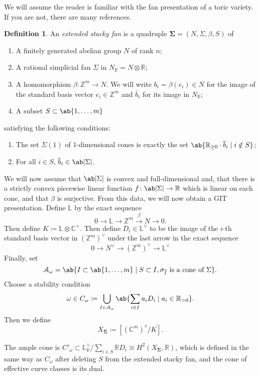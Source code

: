 \documentclass[leqno, openany]{memoir}
\theoremstyle{definition}
\newtheorem{defn}[thm]{Definition}
\theoremstyle{remark}
\theoremstyle{plain}
\theoremstyle{definition}
\theoremstyle{remark}
\newcommand{\R}{\mathbb{R}}
\newcommand{\C}{\mathbb{C}}
\newcommand{\Z}{\mathbb{Z}}
\renewcommand{\L}{\mathbb{L}}
\newcommand{\mc}[1]{\mathcal{#1}}
\newcommand{\ol}[1]{\overline{#1}}
\begin{document}
We will assume the reader is familiar with the fan presentation of a toric variety. If you are not, there are many references.

\begin{defn}
    An \textit{extended stacky fan} is a quadruple $\bm{\Sigma} = (N, \Sigma, \beta, S)$ of
    \begin{enumerate}
        \item A finitely generated abelian group $N$ of rank $n$;
        \item A rational simplicial fan $\Sigma$ in $N_{\R} = N \otimes \R$;
        \item A homomorphism $\beta \colon \Z^m \to N$. We will write $b_i = \beta(e_i) \in N$ for the image of the standard basis vector $e_i \in \Z^m$ and $\ol{b}_i$ for its image in $N_{\R}$;
        \item A subset $S \subset \ab\{1,\ldots,m\}$
    \end{enumerate}
    satisfying the following conditions:
    \begin{enumerate}
        \item The set $\Sigma(1)$ of $1$-dimensional cones is exactly the set $\ab\{\R_{\geq 0} \cdot \ol{b}_i \mid i \notin S \}$;
        \item For all $i \in S$, $\ol{b}_i \in \ab|\Sigma|$.
    \end{enumerate}
\end{defn}

We will now assume that $\ab|\Sigma|$ is convex and full-dimensional and, that there is a strictly convex piecewise linear function $f \colon \ab|\Sigma| \to \R$ which is linear on each cone, and that $\beta$ is surjective. From this data, we will now obtain a GIT presentation. Define $\L$ by the exact sequence
\[ 0 \to \L \xrightarrow{} \Z^m \xrightarrow{\beta} N \to 0. \]
Then define $K \coloneqq \L \otimes \C^{\times}$. Then define $D_i \in \L^{\vee}$ to be the image of the $i$-th standard basis vector in $(\Z^m)^{\vee}$ under the last arrow in the exact sequence
\[ 0 \to N^{\vee} \to (\Z^m)^{\vee} \to \L^{\vee} \]
Finally, set
\[ \mc{A}_{\omega} = \ab\{I \subset \ab\{1,\ldots,m\} \mid S \subset I, \sigma_{\ol{I}} \text{ is a cone of }\Sigma\}. \]
Choose a stability condition
\[ \omega \in C_{\omega} \coloneqq \bigcup_{I \in \mc{A}_{\omega}} \ab\{ \sum_{i \in I} a_i D_i \mid a_i \in \R_{>0}\}. \]
Then we define
\[ X_{\bm{\Sigma}} \coloneqq [(\C^m)^{s} / K]. \]

The ample cone is $C'_{\omega} \subset \L^{\vee}_{\R} / \sum_{i \in S} \R D_i \cong H^2(X_{\bm{\Sigma}}, \R)$, which is defined in the same way as $C_{\omega}$ after deleting $S$ from the extended stacky fan, and the cone of effective curve classes is its dual.
\end{document}
